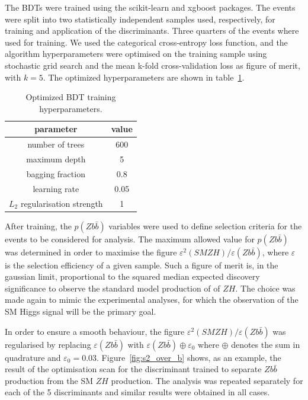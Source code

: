 The BDTs were trained using the scikit-learn and xgboost packages. The events were
split into two statistically independent samples used, respectively, for training and
application of the discriminants. Three quarters of the events where used for training. 
We used the categorical cross-entropy loss function, and the algorithm hyperparameters were
optimised on the training sample using stochastic grid search and the mean
k-fold cross-validation loss as figure of merit, with $k = 5$.
The optimized hyperparameters are shown in table~\ref{tab:bdt_hpars}.

\begin{table}
\centering
\begin{tabular}{||c|c||}
parameter & value \\
\hline
number of trees & 600 \\
maximum depth & 5 \\
bagging fraction & 0.8 \\
learning rate & 0.05 \\
$L_2$ regularisation strength & 1 \\
\end{tabular}
\caption{
\label{tab:bdt_hpars}
Optimized BDT training hyperparameters.
}
\end{table}

After training, the $p(Z b\bar{b})$ variables were used to define selection criteria
for the events to be considered for analysis. The maximum allowed value for $p(Z b\bar{b})$
was determined in order to maximise the figure $\varepsilon^2(SM Z H) / \varepsilon(Z
b\bar{b})$, where $\varepsilon$ is the selection efficiency of a given sample. Such a
figure of merit is, in the gaussian limit, proportional to the squared median expected
discovery significance to observe the standard model production of of $Z H$.
The choice was made again to mimic the experimental analyses, for which the observation of
the SM Higgs signal will be the primary goal.

In order to ensure a smooth behaviour, the figure $\varepsilon^2(SM Z H) /
\varepsilon(Zb\bar{b})$ was regularised by replacing $\varepsilon(Zb\bar{b})$ with
$\varepsilon(Zb\bar{b}) \oplus \varepsilon_0$ where $\oplus$ denotes the sum in quadrature
and $\varepsilon_0 = 0.03$.
Figure~\ref{fig:s2_over_b} shows, as an example, the result of the optimisation scan for
the discriminant trained to separate $Z b\bar{b}$ production from the SM $Z H$
production. The analysis was repeated separately for each of the 5 discriminants and
similar results were obtained in all cases.


